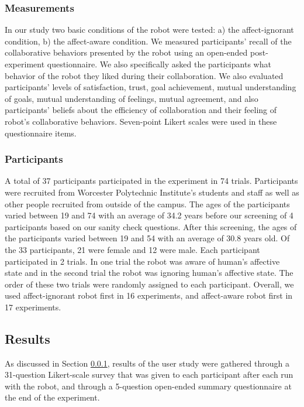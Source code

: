 \documentclass[12pt]{report}
\begin{document}
\subsubsection{Measurements}
\label{sec:Measurements}
In our study two basic conditions of the robot were tested: a) the
affect-ignorant condition, b) the affect-aware condition. We measured
participants' recall of the collaborative behaviors presented by the robot using
an open-ended post-experiment questionnaire. We also specifically asked the
participants what behavior of the robot they liked during their collaboration.
We also evaluated participants' levels of satisfaction, trust, goal achievement,
mutual understanding of goals, mutual understanding of feelings, mutual
agreement, and also participants' beliefs about the efficiency of collaboration
and their feeling of robot's collaborative behaviors. Seven-point Likert scales
were used in these questionnaire items.

\subsubsection{Participants}
\label{sec:Participants}
A total of 37 participants participated in the experiment in 74 trials.
Participants were recruited from Worcester Polytechnic Institute's students and
staff as well as other people recruited from outside of the campus. The ages
of the participants varied between 19 and 74 with an average of 34.2 years
before our screening of 4 participants based on our sanity check questions. After
this screening, the ages of the participants varied between 19 and 54 with an
average of 30.8 years old. Of the 33 participants, 21 were female and 12
were male. Each participant participated in 2 trials. In one trial the robot was
aware of human's affective state and in the second trial the robot was ignoring human's
affective state. The order of these two trials were randomly assigned to each
participant. Overall, we used affect-ignorant robot first in 16 experiments,
and affect-aware robot first in 17 experiments.

\subsection{Results}

As discussed in Section \ref{sec:Measurements}, results of the user study were
gathered through a 31-question Likert-scale survey that was given to each
participant after each run with the robot, and through a 5-question open-ended
summary questionnaire at the end of the experiment.
\end{document}
